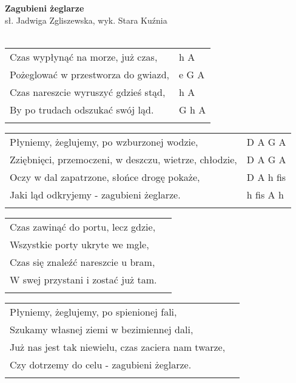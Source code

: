 \documentclass[a5paper]{article}
\begin{document}


\noindent
\fontsize{12pt}{15pt}\selectfont
\textbf{Zagubieni żeglarze} \\
\fontsize{8pt}{10pt}\selectfont
sł. Jadwiga Zgliszewska, wyk. Stara Kuźnia \\ \\
\fontsize{10pt}{12pt}\selectfont
{}
\begin{tabular}{@{}p{9.20cm}p{3cm}@{}}
\noindent
Czas wypłynąć na morze, już czas, & h A \\
Pożeglować w przestworza do gwiazd, & e G A \\
Czas nareszcie wyruszyć gdzieś stąd, & h A \\
By po trudach odszukać swój ląd. & G h A \\ \\
\end{tabular}

\noindent
\begin{tabular}{@{}p{8.20cm}p{3cm}@{}}
Płyniemy, żeglujemy, po wzburzonej wodzie, & D A G A \\
Zziębnięci, przemoczeni, w deszczu, wietrze, chłodzie, & D A G A \\
Oczy w dal zapatrzone, słońce drogę pokaże, & D A h fis \\
Jaki ląd odkryjemy - zagubieni żeglarze. & h fis A h \\ \\
\end{tabular}

\noindent
\begin{tabular}{@{}p{8.20cm}p{3cm}@{}}
Czas zawinąć do portu, lecz gdzie,	 \\
Wszystkie porty ukryte we mgle,	\\
Czas się znaleźć nareszcie u bram,\\	
W swej przystani i zostać już tam.	\\ \\
\end{tabular}

\noindent
\begin{tabular}{@{}p{8.20cm}p{3cm}@{}}
Płyniemy, żeglujemy, po spienionej fali,	\\
Szukamy własnej ziemi w bezimiennej dali,	\\
Już nas jest tak niewielu, czas zaciera nam twarze,	\\
Czy dotrzemy do celu - zagubieni żeglarze.	\\ \\
\end{tabular}
\end{document}
